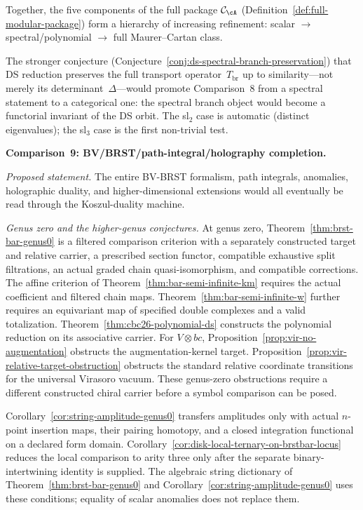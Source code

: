 Together, the five components of the full package
$\mathcal{C}_{\cA}$
(Definition~\ref{def:full-modular-package}) form a hierarchy
of increasing refinement: scalar $\to$ spectral/polynomial
$\to$ full Maurer--Cartan class.

The stronger conjecture
(Conjecture~\ref{conj:ds-spectral-branch-preservation}) that
DS reduction preserves the full transport operator~$T_{\mathrm{br}}$
up to similarity---not merely its determinant~$\Delta$---would
promote Comparison~8 from a spectral statement to a categorical one:
the spectral branch object would become a functorial invariant of
the DS orbit.  The sl${}_2$ case is automatic (distinct eigenvalues);
the sl${}_3$ case is the first non-trivial test.

\medskip

\noindent\textbf{Comparison~9: BV/BRST/path-integral/holography
completion.}

\emph{Proposed statement.}
The entire BV-BRST formalism, path integrals, anomalies,
holographic duality, and higher-dimensional extensions would all
eventually be read through the Koszul-duality machine.

\emph{Genus zero and the higher-genus conjectures.}
At genus zero, Theorem~\ref{thm:brst-bar-genus0} is a filtered comparison criterion with a separately constructed target and relative carrier, a prescribed section functor, compatible exhaustive split filtrations, an actual graded chain quasi-isomorphism, and compatible corrections.
The affine criterion of Theorem~\ref{thm:bar-semi-infinite-km} requires the actual coefficient and filtered chain maps.
Theorem~\ref{thm:bar-semi-infinite-w} further requires an equivariant map of specified double complexes and a valid totalization.
Theorem~\ref{thm:cbc26-polynomial-ds} constructs the polynomial reduction on its associative carrier.
For $V\otimes bc$, Proposition~\ref{prop:vir-no-augmentation} obstructs the augmentation-kernel target.
Proposition~\ref{prop:vir-relative-target-obstruction} obstructs the standard relative coordinate transitions for the universal Virasoro vacuum.
These genus-zero obstructions require a different constructed chiral carrier before a symbol comparison can be posed.

Corollary~\ref{cor:string-amplitude-genus0} transfers amplitudes only with actual $n$-point insertion maps, their pairing homotopy, and a closed integration functional on a declared form domain.
Corollary~\ref{cor:disk-local-ternary-on-brstbar-locus} reduces the local comparison to arity three only after the separate binary-intertwining identity is supplied.
The algebraic string dictionary of Theorem~\ref{thm:brst-bar-genus0} and Corollary~\ref{cor:string-amplitude-genus0} uses these conditions; equality of scalar anomalies does not replace them.


